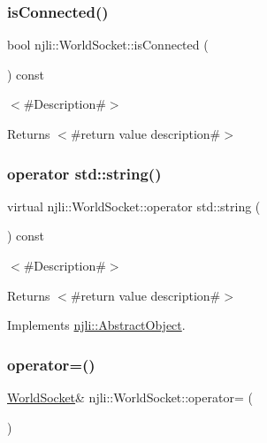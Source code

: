 \subsubsection{\texorpdfstring{is\+Connected()}{isConnected()}}
{\footnotesize\ttfamily bool njli\+::\+World\+Socket\+::is\+Connected (\begin{DoxyParamCaption}{ }\end{DoxyParamCaption}) const}

$<$\#\+Description\#$>$

\begin{DoxyReturn}{Returns}
$<$\#return value description\#$>$ 
\end{DoxyReturn}
\mbox{\label{classnjli_1_1_world_socket_a6a0a48963031efd27782ea8c6d256663}} 
\subsubsection{\texorpdfstring{operator std\+::string()}{operator std::string()}}
{\footnotesize\ttfamily virtual njli\+::\+World\+Socket\+::operator std\+::string (\begin{DoxyParamCaption}{ }\end{DoxyParamCaption}) const\hspace{0.3cm}{\ttfamily [virtual]}}

$<$\#\+Description\#$>$

\begin{DoxyReturn}{Returns}
$<$\#return value description\#$>$ 
\end{DoxyReturn}


Implements \mbox{\hyperlink{classnjli_1_1_abstract_object_afc07f4138bd3003910e7aa7fa0fe11ad}{njli\+::\+Abstract\+Object}}.

\mbox{\label{classnjli_1_1_world_socket_a1a085ac09dc8bd9504fa4c03b1f4d86d}} 
\subsubsection{\texorpdfstring{operator=()}{operator=()}}
{\footnotesize\ttfamily \mbox{\hyperlink{classnjli_1_1_world_socket}{World\+Socket}}\& njli\+::\+World\+Socket\+::operator= (\begin{DoxyParamCaption}\item[{const \mbox{\hyperlink{classnjli_1_1_world_socket}{World\+Socket}} \&}]{ }\end{DoxyParamCaption})\hspace{0.3cm}{\ttfamily [private]}}

